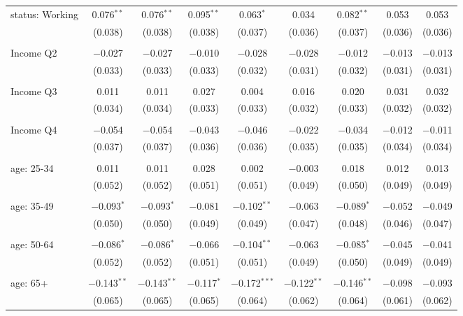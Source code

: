 \begin{tabular}{@{\extracolsep{5pt}}lcccccccc}
 status: Working & 0.076$^{**}$ & 0.076$^{**}$ & 0.095$^{**}$ & 0.063$^{*}$ & 0.034 & 0.082$^{**}$ & 0.053 & 0.053 \\ 
  & (0.038) & (0.038) & (0.038) & (0.037) & (0.036) & (0.037) & (0.036) & (0.036) \\ 
  & & & & & & & & \\ 
 Income Q2 & $-$0.027 & $-$0.027 & $-$0.010 & $-$0.028 & $-$0.028 & $-$0.012 & $-$0.013 & $-$0.013 \\ 
  & (0.033) & (0.033) & (0.033) & (0.032) & (0.031) & (0.032) & (0.031) & (0.031) \\ 
  & & & & & & & & \\ 
 Income Q3 & 0.011 & 0.011 & 0.027 & 0.004 & 0.016 & 0.020 & 0.031 & 0.032 \\ 
  & (0.034) & (0.034) & (0.033) & (0.033) & (0.032) & (0.033) & (0.032) & (0.032) \\ 
  & & & & & & & & \\ 
 Income Q4 & $-$0.054 & $-$0.054 & $-$0.043 & $-$0.046 & $-$0.022 & $-$0.034 & $-$0.012 & $-$0.011 \\ 
  & (0.037) & (0.037) & (0.036) & (0.036) & (0.035) & (0.035) & (0.034) & (0.034) \\ 
  & & & & & & & & \\ 
 age: 25-34 & 0.011 & 0.011 & 0.028 & 0.002 & $-$0.003 & 0.018 & 0.012 & 0.013 \\ 
  & (0.052) & (0.052) & (0.051) & (0.051) & (0.049) & (0.050) & (0.049) & (0.049) \\ 
  & & & & & & & & \\ 
 age: 35-49 & $-$0.093$^{*}$ & $-$0.093$^{*}$ & $-$0.081 & $-$0.102$^{**}$ & $-$0.063 & $-$0.089$^{*}$ & $-$0.052 & $-$0.049 \\ 
  & (0.050) & (0.050) & (0.049) & (0.049) & (0.047) & (0.048) & (0.046) & (0.047) \\ 
  & & & & & & & & \\ 
 age: 50-64 & $-$0.086$^{*}$ & $-$0.086$^{*}$ & $-$0.066 & $-$0.104$^{**}$ & $-$0.063 & $-$0.085$^{*}$ & $-$0.045 & $-$0.041 \\ 
  & (0.052) & (0.052) & (0.051) & (0.051) & (0.049) & (0.050) & (0.049) & (0.049) \\ 
  & & & & & & & & \\ 
 age: 65+ & $-$0.143$^{**}$ & $-$0.143$^{**}$ & $-$0.117$^{*}$ & $-$0.172$^{***}$ & $-$0.122$^{**}$ & $-$0.146$^{**}$ & $-$0.098 & $-$0.093 \\ 
  & (0.065) & (0.065) & (0.065) & (0.064) & (0.062) & (0.064) & (0.061) & (0.062) \\ 

\end{tabular}
